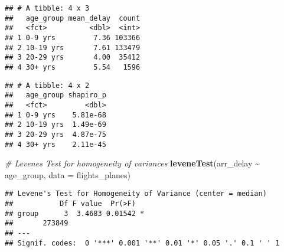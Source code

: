 \documentclass[
]{article}
\newenvironment{Shaded}{\begin{snugshade}}{\end{snugshade}}
\newcommand{\AttributeTok}[1]{\textcolor[rgb]{0.13,0.29,0.53}{#1}}
\newcommand{\CommentTok}[1]{\textcolor[rgb]{0.56,0.35,0.01}{\textit{#1}}}
\newcommand{\ConstantTok}[1]{\textcolor[rgb]{0.56,0.35,0.01}{#1}}
\newcommand{\DecValTok}[1]{\textcolor[rgb]{0.00,0.00,0.81}{#1}}
\newcommand{\FunctionTok}[1]{\textcolor[rgb]{0.13,0.29,0.53}{\textbf{#1}}}
\newcommand{\NormalTok}[1]{#1}
\newcommand{\OtherTok}[1]{\textcolor[rgb]{0.56,0.35,0.01}{#1}}
\newcommand{\SpecialCharTok}[1]{\textcolor[rgb]{0.81,0.36,0.00}{\textbf{#1}}}
\begin{document}
\begin{verbatim}
## # A tibble: 4 x 3
##   age_group mean_delay  count
##   <fct>          <dbl>  <int>
## 1 0-9 yrs         7.36 103366
## 2 10-19 yrs       7.61 133479
## 3 20-29 yrs       4.00  35412
## 4 30+ yrs         5.54   1596
\end{verbatim}

\begin{Shaded}
\end{Shaded}

\begin{verbatim}
## # A tibble: 4 x 2
##   age_group shapiro_p
##   <fct>         <dbl>
## 1 0-9 yrs    5.81e-68
## 2 10-19 yrs  1.49e-69
## 3 20-29 yrs  4.87e-75
## 4 30+ yrs    2.11e-45
\end{verbatim}

\begin{Shaded}
\begin{Highlighting}[]
\CommentTok{\# Levene\textquotesingle{}s Test for homogeneity of variances}
\FunctionTok{leveneTest}\NormalTok{(arr\_delay }\SpecialCharTok{\textasciitilde{}}\NormalTok{ age\_group, }\AttributeTok{data =}\NormalTok{ flights\_planes)}
\end{Highlighting}
\end{Shaded}

\begin{verbatim}
## Levene's Test for Homogeneity of Variance (center = median)
##           Df F value  Pr(>F)  
## group      3  3.4683 0.01542 *
##       273849                  
## ---
## Signif. codes:  0 '***' 0.001 '**' 0.01 '*' 0.05 '.' 0.1 ' ' 1
\end{verbatim}
\end{document}
